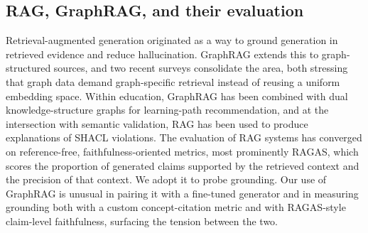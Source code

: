 \documentclass[sageh]{sagej}
\begin{document}
\subsection{RAG, GraphRAG, and their evaluation}
Retrieval-augmented generation originated as a way to ground generation in retrieved evidence and reduce hallucination.\cite{lewis2020rag,ji2023hallucination,huang2023hallucination} GraphRAG extends this to graph-structured sources, and two recent surveys consolidate the area, both stressing that graph data demand graph-specific retrieval instead of reusing a uniform embedding space.\cite{edge2024graphrag,peng2024graphrag,han2025graphrag} Within education, GraphRAG has been combined with dual knowledge-structure graphs for learning-path recommendation,\cite{cheng2025graphrag} and at the intersection with semantic validation, RAG has been used to produce explanations of SHACL violations.\cite{publio2025xpshacl} The evaluation of RAG systems has converged on reference-free, faithfulness-oriented metrics, most prominently RAGAS, which scores the proportion of generated claims supported by the retrieved context and the precision of that context.\cite{es2023ragas} We adopt it to probe grounding. Our use of GraphRAG is unusual in pairing it with a fine-tuned generator and in measuring grounding both with a custom concept-citation metric and with RAGAS-style claim-level faithfulness, surfacing the tension between the two.
\end{document}
